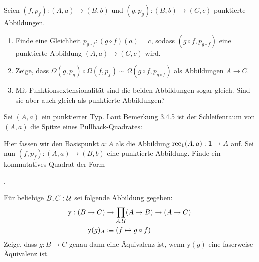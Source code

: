 \documentclass{uebung}
\begin{document}

\begin{exercise}
  Seien $(f,p_f):(A,a)\to (B,b)$ und $(g,p_g):(B,b)\to (C,c)$ punktierte Abbildungen.
  \begin{enumerate}
    \item Finde eine Gleichheit $p_{g\circ f}:(g\circ f)(a)=c$, sodass $(g\circ f,p_{g\circ f})$ eine punktierte Abbildung $(A,a)\to (C,c)$ wird.
    \item Zeige, dass $\Omega(g,p_g)\circ\Omega(f,p_f) \sim \Omega(g\circ f,p_{g\circ f})$ als Abbildungen $A\to C$.
    \item Mit Funktionsextensionalität sind die beiden Abbildungen sogar gleich.
      Sind sie aber auch gleich als punktierte Abbildungen?
  \end{enumerate}
\end{exercise}

\begin{exercise}
  Sei $(A,a)$ ein punktierter Typ.
  Laut Bemerkung 3.4.5 ist der Schleifenraum von $(A,a)$ die Spitze eines Pullback-Quadrates:
  \begin{center}
  \end{center}
  Hier fassen wir den Basispunkt $a:A$ als die Abbildung $\mathrm{rec}_{\mathbf{1}}(A,a):\mathbf{1} \to A$ auf.
  Sei nun $(f,p_f):(A,a)\to (B,b)$ eine punktierte Abbildung.
  Finde ein kommutatives Quadrat der Form
  \begin{center}
    .
  \end{center}
\end{exercise}

\begin{exercise}
  Für beliebige $B,C:\mathcal{U}$ sei folgende Abbildung gegeben:
  \begin{align*}
    \mathrm{y}:(B\to C) &\to \prod_{A:\mathcal{U}} (A \to B) \to (A \to C)\\
    \mathrm{y}(g)_A &\vcentcolon\mspace{-1.2mu}\equiv (f \mapsto g\circ f)
  \end{align*}
  Zeige, dass $g:B \to C$ genau dann eine Äquivalenz ist, wenn $\mathrm{y}(g)$ eine faserweise Äquivalenz ist.
\end{exercise}
\end{document}
